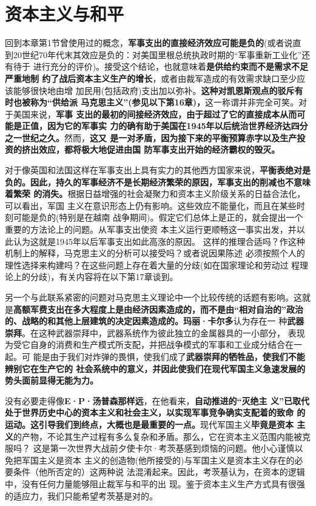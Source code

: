 \section{资本主义与和平}
回到本章第1节曾使用过的概念，\textbf{军事支出的直接经济效应可能是负的}(或者说直
到20世纪70年代末其效应是负的：对美国里根总统执政时期的“军事重新工业化”还有待于
进行充分的评价)。接受这个结论，也就意味着\textbf{是供给约束而不是需求不足严重地制
  约了战后资本主义生产的增长}，或者由裁军造成的有效需求缺口至少应该能够很快地由增
加民用(包括政府)支出加以弥补。\textbf{这种对凯恩斯观点的驳斥有时也被称为“供给派
  马克思主义”(参见以下第16章)，}这一称谓并非完全可笑。对于美国来说，\textbf{军事
  支出的最初的间接经济效应，由于超过了它的直接成本从而可能是正值，因为它的军事实
  力的确有助于美国在1945年以后统治世界经济达四分之一世纪之久。}然而，\textbf{这又
  是一对矛盾，因为接下来的平衡预算赤字以及生产投资的挤出效应，都将极大地促进由国
  防军事支出开始的经济霸权的毁灭。}

对于像英国和法国这样在军事支出上具有实力的其他西方国家来说，\textbf{平衡表绝对是
  负的。因此，持久的军事经济不是长期经济繁荣的原因，军事支出的削减也不意味着繁荣
  的消失。}根据日益增强的社会凝聚力和资本主义阶级关系的日益合法化，可以看出，军国
主义在意识形态上仍有影响。这些效应不能量化，而且在某些时刻可能是负的(特别是在越南
战争期间)。假定它们总体上是正的，就会提出一个重要的方法论上的问题。从军事支出使资
本主义运行更顺畅这一事实出发，并以此认为这就是1945年以后军事支出如此高涨的原因。
这样的推理合适吗？作这种机制上的解释，马克思主义的分析可以接受吗？或者说因果陈述
必须按照个人的理性选择来构建吗？在这些问题上存在着大量的分歧(如在国家理论和劳动过
程理论上的分歧)，有关内容将在以下第17章谈到。

另一个与此联系紧密的问题对马克思主义理论中一个比较传统的话题有影响。这就
是\textbf{高额军费支出在多大程度上是由经济因素造成的，而不是由“相对自治的”政治
  的、战略的和其他上层建筑的决定因素造成的。}\textbf{玛丽·卡尔多}认为存在一
种\textbf{武器崇拜}。在这种武器崇拜中，武器系统作为彼此独立的金属器具的一小部分，
表现为受它自身的消费和生产模式所支配，并把战争模式的军事和工业成分结合在一起。可
能是由于我们对炸弹的畏惧，使我们成了\textbf{武器崇拜的牺牲品，使我们不能辨别它在生产它的
社会系统中的意义，并因此使我们在现代军国主义急速发展的势头面前显得无能为力。}

没有必要走得像\textbf{E·P·汤普森那样远}，在他看来，\textbf{自动推进的“灭绝主
  义”已取代处于世界历史中心的资本主义和社会主义，以实现军事竞争确实支配着的致命
  的运动。这引导我们到终点，大概也是最重要的一点。}现代军国主义\textbf{毕竟是资本
  主义}的产物，不论其生产过程有多么复杂和矛盾。那么，它在资本主义范围内能被克服吗？
这是第一次世界大战前夕使卡尔·考茨基感到烦恼的问题。他小心谨慎以免把军国主义是资本
主义的创造物(他所接受的)与军国主义是资本主义存在的必要条件（他所否定的）这两种说
法混淆起来。因此，考茨基认为，在资本的逻辑中，没有任何力量能够阻止裁军与和平的出
现。鉴于资本主义生产方式具有很强的适应力，我们只能希望考茨基是对的。






